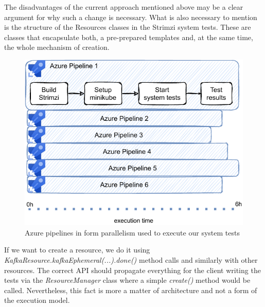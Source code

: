 The disadvantages of the current approach mentioned above may be a clear argument for why such a change is necessary.
What is also necessary to mention is the structure of the Resources classes in the Strimzi system tests.
These are classes that encapsulate both, a pre-prepared templates and, at the same time, the whole mechanism of creation.
\begin{figure}[!ht]
    \centering
    \includegraphics[scale=1]{obrazky-figures/06-proposal-of-parallel-approach/01a-azure_pipelines_with_test_results.pdf}
    \caption{Azure pipelines in form parallelism used to execute our system tests}
    \label{05:fig:azurepiplines}
\end{figure}
If we want to create a resource, we do it using \emph{KafkaResource.kafkaEphemeral(...).done()} method calls and similarly with other resources.
The correct API should propagate everything for the client writing the tests via the \emph{ResourceManager} class where a simple \emph{create()} method would be called.
Nevertheless, this fact is more a matter of architecture and not a form of the execution model.

